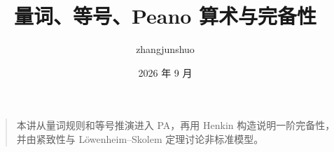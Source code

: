 \documentclass[UTF8,a4paper,11pt]{ctexart}
\title{量词、等号、Peano 算术与完备性}
\author{zhangjunshuo}\date{2026 年 9 月}
\begin{document}
\maketitle
\begin{quote}
本讲从量词规则和等号推演进入 PA，再用 Henkin 构造说明一阶完备性，并由紧致性与 Löwenheim--Skolem 定理讨论非标准模型。
\end{quote}
\tableofcontents\clearpage
\clearpage
\clearpage
\clearpage

\end{document}
